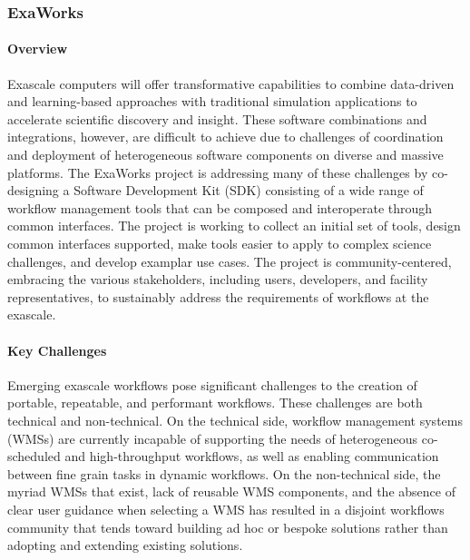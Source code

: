 
\subsubsection{ ExaWorks} \label{subsubsect:exaworks}


\paragraph{Overview} 
Exascale computers will offer transformative capabilities to combine
data-driven and learning-based approaches with traditional simulation
applications to accelerate scientific discovery and insight. These software
combinations and integrations, however, are difficult to achieve due to
challenges of coordination and deployment of heterogeneous software components
on diverse and massive platforms. The ExaWorks project is addressing 
many of these challenges by co-designing a Software Development Kit (SDK)
consisting of a wide range of workflow management tools that can be
composed and interoperate through common interfaces. 
The project is working to collect an initial
set of tools, design common interfaces supported, make tools
easier to apply to complex science challenges, and develop examplar use cases.
The project is community-centered, embracing the various stakeholders, including
users, developers, and facility representatives, to 
sustainably address the requirements of workflows at
the exascale.




\paragraph{Key Challenges}
Emerging exascale workflows pose significant challenges to the creation of
portable, repeatable, and performant workflows. These challenges are both
technical and non-technical. On the technical side, workflow management systems (WMSs) are currently
incapable of supporting the needs of heterogeneous co-scheduled and
high-throughput workflows, as well as enabling communication between fine
grain tasks in dynamic workflows. On the non-technical side, the myriad WMSs
that exist, lack of reusable WMS components, and the absence  of clear user
guidance when selecting a WMS has resulted in a disjoint workflows community
that tends toward building ad hoc or bespoke solutions rather than adopting
and extending existing solutions.

